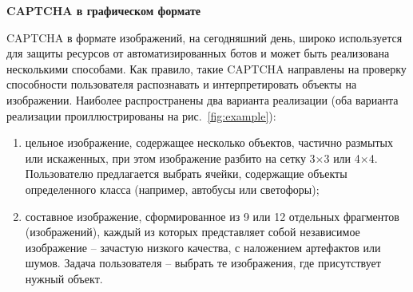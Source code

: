 \textbf{CAPTCHA в графическом формате}

CAPTCHA в формате изображений, на сегодняшний день, широко используется для 
защиты ресурсов от автоматизированных ботов и может быть реализована несколькими 
способами. Как правило, такие CAPTCHA направлены на проверку способности 
пользователя распознавать и интерпретировать объекты на изображении. Наиболее 
распространены два варианта реализации (оба варианта реализации проиллюстрированы 
на рис.~\ref{fig:example}):

\begin{enumerate}
    \item цельное изображение, содержащее несколько объектов, частично размытых 
    или искаженных, при этом изображение разбито на сетку 3×3 или 4×4. 
    Пользователю предлагается выбрать ячейки, содержащие объекты определенного 
    класса (например, автобусы или светофоры);
    \item составное изображение, сформированное из 9 или 12 отдельных фрагментов 
    (изображений), каждый из которых представляет собой независимое изображение 
    -- зачастую низкого качества, с наложением артефактов или шумов. Задача 
    пользователя -- выбрать те изображения, где присутствует нужный объект.
\end{enumerate}

